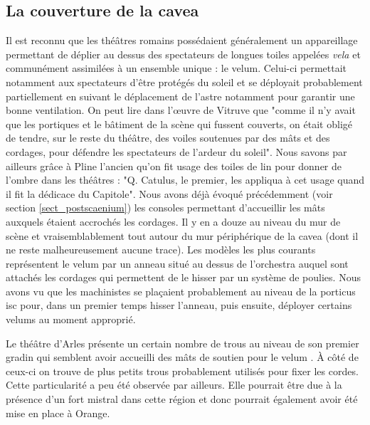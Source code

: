 		\subsection{La couverture de la \gls{cavea}} \label{section velum}
		
		Il est reconnu que les théâtres romains possédaient généralement un appareillage permettant de déplier au dessus des spectateurs de longues toiles appelées \textit{vela} et communément assimilées à un ensemble unique : le \gls{velum}. Celui-ci permettait notamment aux spectateurs d'être protégés du soleil et se déployait probablement partiellement en suivant le déplacement de l'astre notamment pour garantir une bonne ventilation. On peut lire dans l'\oe{}uvre de Vitruve\cite[p. 38]{vitruve} que "comme il n'y avait que les portiques et le bâtiment de la scène qui fussent couverts, on était obligé de tendre, sur le reste du théâtre, des voiles soutenues par des mâts et des cordages, pour défendre les spectateurs de l'ardeur du soleil". Nous savons par ailleurs grâce à Pline l'ancien \cite[V-VI]{pline} qu'on fit usage des toiles de lin pour donner de l'ombre dans les théâtres : "Q. Catulus, le premier, les appliqua à cet usage quand il fit la dédicace du Capitole". Nous avons déjà évoqué précédemment (voir section \ref{sect_postscaenium}) les \glspl{console} permettant d'accueillir les mâts auxquels étaient accrochés les cordages. Il y en a douze au niveau du mur de scène et vraisemblablement tout autour du mur périphérique de la \gls{cavea} (dont il ne reste malheureusement aucune trace). Les modèles les plus courants représentent le \gls{velum} par un anneau situé au dessus de l'\gls{orchestra} auquel sont attachés les cordages qui permettent de le hisser par un système de poulies. Nous avons vu que les machinistes se plaçaient probablement au niveau de la \gls{porticus isc} pour, dans un premier temps hisser l'anneau, puis ensuite, déployer certains \glspl{velum} au moment approprié.  
		
		Le théâtre d'Arles présente un certain nombre de trous au niveau de son premier gradin qui semblent avoir accueilli des mâts de soutien pour le \gls{velum} \cite[p. 38]{formige}. À côté de ceux-ci on trouve de plus petits trous probablement utilisés pour fixer les cordes. Cette particularité a peu été observée par ailleurs. Elle pourrait être due à la présence d'un fort mistral dans cette région et donc pourrait également avoir été mise en place à Orange. 


